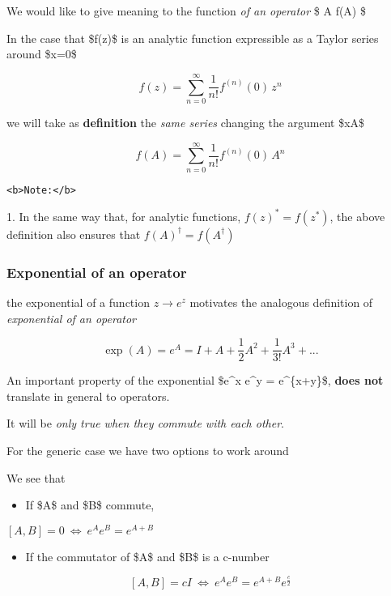 \documentclass[11pt]{article}
\providecommand{\tightlist}{%
      \setlength{\itemsep}{0pt}\setlength{\parskip}{0pt}}
\begin{document}
We would like to give meaning to the function \emph{of an operator} \$ A
\to f(A) \$

    In the case that \$f(z)\$ is an analytic function expressible as a
Taylor series around \$x=0\$

\[
f(z) = \sum_{n=0}^\infty \frac{1}{n!} f^{(n)}(0)\,  z^n
\]

we will take as \textbf{definition} the \emph{same series} changing the
argument \$x\to A\$

\[
f(A) = \sum_{n=0}^\infty \frac{1}{n!} f^{(n)}(0)\,  A^n
\]

    \begin{verbatim}
<b>Note:</b> 
\end{verbatim}

1. In the same way that, for analytic functions, \(f(z)^* = f(z^*)\),
the above definition also ensures that \(f(A)^\dagger = f(A^\dagger)\)

    \subsubsection{Exponential of an
operator}\label{exponential-of-an-operator}

the exponential of a function \(z\to e^z\) motivates the analogous
definition of \emph{exponential of an operator}

\[
\exp(A) = e^A = I + A + \frac{1}{2} A^2 + \frac{1}{3!} A^3 + ...
\]

    An important property of the exponential \$e\^{}x e\^{}y =
e\^{}\{x+y\}\$, \textbf{does not} translate in general to operators.

It will be \emph{only true when they commute with each other}.

For the generic case we have two options to work around

    

    We see that

\begin{itemize}
\tightlist
\item
  If \$A\$ and \$B\$ commute,
\end{itemize}

\([A,B]=0 ~\Leftrightarrow ~e^A e^B = e^{A+B}\)

    \begin{itemize}
\tightlist
\item
  If the commutator of \$A\$ and \$B\$ is a c-number
\end{itemize}

\[[A,B]= c I  ~\Leftrightarrow ~  e^A e^B = e^{A+B } e^{ \frac{c}{2}}\]
\end{document}
